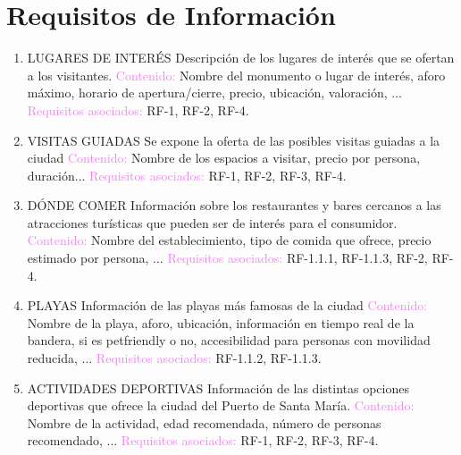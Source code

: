 \chapter{Requisitos de Informaci\'on}
\begin{enumerate}[label=\textbf{\textcolor{red}{RI-\arabic*}}]
    \item LUGARES DE INTERÉS \newline
    Descripción de los lugares de interés que se ofertan a los visitantes. \newline
    \textcolor{violet}{Contenido:} Nombre del monumento o lugar de interés, aforo máximo, horario de apertura/cierre, precio, ubicación, valoración, ...\newline
    \textcolor{violet}{Requisitos asociados:} RF-1, RF-2, RF-4.
    \item VISITAS GUIADAS \newline
    Se expone la oferta de las posibles visitas guiadas a la ciudad \newline
    \textcolor{violet}{Contenido:} Nombre de los espacios a visitar, precio por persona, duración...\newline
    \textcolor{violet}{Requisitos asociados:} RF-1, RF-2, RF-3, RF-4.
    \item DÓNDE COMER \newline
    Información sobre los restaurantes y bares cercanos a las atracciones turísticas que pueden ser de interés para el consumidor. \newline
    \textcolor{violet}{Contenido:} Nombre del establecimiento, tipo de comida que ofrece, precio estimado por persona, ...\newline
    \textcolor{violet}{Requisitos asociados: } RF-1.1.1, RF-1.1.3, RF-2, RF-4.    
    \item PLAYAS \newline
    Informaci\'on de las playas más famosas de la ciudad \newline
    \textcolor{violet}{Contenido:} Nombre de la playa, aforo, ubicación, información en tiempo real de la bandera, si es petfriendly o no, accesibilidad para personas con movilidad reducida, ...\newline
    \textcolor{violet}{Requisitos asociados:} RF-1.1.2, RF-1.1.3. 
    \item ACTIVIDADES DEPORTIVAS \newline
    Informaci\'on de las distintas opciones deportivas que ofrece la ciudad del Puerto de Santa María. \newline
    \textcolor{violet}{Contenido:} Nombre de la actividad, edad recomendada, número de personas recomendado, ...\newline
    \textcolor{violet}{Requisitos asociados:} RF-1, RF-2, RF-3, RF-4.
\end{enumerate}